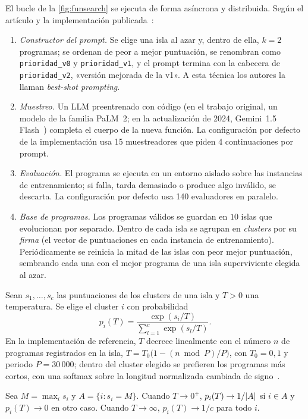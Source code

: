 El bucle de la \cref{fig:funsearch} se ejecuta de forma asíncrona y distribuida. Según el artículo y la implementación publicada~\cite{funsearch,funsearch-code}:
\begin{enumerate}[label=\arabic*.]
  \item \emph{Constructor del prompt.} Se elige una isla al azar y, dentro de ella, $k=2$ programas; se ordenan de peor a mejor puntuación, se renombran como \texttt{prioridad\_v0} y \texttt{prioridad\_v1}, y el prompt termina con la cabecera de \texttt{prioridad\_v2}, «versión mejorada de la v1». A esta técnica los autores la llaman \emph{best-shot prompting}.
  \item \emph{Muestreo.} Un LLM preentrenado con código (en el trabajo original, un modelo de la familia PaLM~2; en la actualización de 2024, Gemini~1.5 Flash~\cite{fs-blog}) completa el cuerpo de la nueva función. La configuración por defecto de la implementación usa 15 muestreadores que piden 4 continuaciones por prompt.
  \item \emph{Evaluación.} El programa se ejecuta en un entorno aislado sobre las instancias de entrenamiento; si falla, tarda demasiado o produce algo inválido, se descarta. La configuración por defecto usa 140 evaluadores en paralelo.
  \item \emph{Base de programas.} Los programas válidos se guardan en $10$ islas que evolucionan por separado. Dentro de cada isla se agrupan en \emph{clusters} por su \emph{firma} (el vector de puntuaciones en cada instancia de entrenamiento). Periódicamente se reinicia la mitad de las islas con peor mejor puntuación, sembrando cada una con el mejor programa de una isla superviviente elegida al azar.
\end{enumerate}

\begin{definicion}\label{def:softmax-clusters}
Sean $s_1,\dots,s_c$ las puntuaciones de los clusters de una isla y $T>0$ una temperatura. Se elige el cluster $i$ con probabilidad
\[
p_i(T)=\frac{\exp(s_i/T)}{\sum_{l=1}^{c}\exp(s_l/T)}.
\]
En la implementación de referencia, $T$ decrece linealmente con el número $n$ de programas registrados en la isla, $T=T_0\bigl(1-(n\bmod P)/P\bigr)$, con $T_0=0{,}1$ y periodo $P=30\,000$; dentro del cluster elegido se prefieren los programas más cortos, con una softmax sobre la longitud normalizada cambiada de signo~\cite{funsearch-code}.
\end{definicion}

\begin{proposicion}\label{prop:temperatura}
Sea $M=\max_i s_i$ y $A=\{i: s_i=M\}$. Cuando $T\to 0^{+}$, $p_i(T)\to 1/\lvert A\rvert$ si $i\in A$ y $p_i(T)\to 0$ en otro caso. Cuando $T\to\infty$, $p_i(T)\to 1/c$ para todo $i$.
\end{proposicion}

